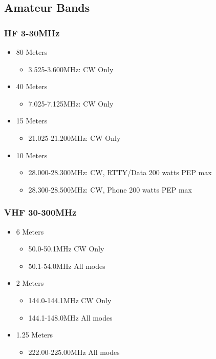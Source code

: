 \documentclass[10pt, handout]{beamer}
\begin{document}
\subsection{Amateur Bands}

\begin{frame}
\frametitle{HF 3-30MHz}
	\begin{itemize}
	\item 80 Meters
		\begin{itemize}
		\item 3.525-3.600MHz: CW Only
		\end{itemize}
	\item 40 Meters
		\begin{itemize}
		\item 7.025-7.125MHz: CW Only
		\end{itemize}
	\item 15 Meters
		\begin{itemize}
		\item 21.025-21.200MHz: CW Only
		\end{itemize}
	\item 10 Meters 
		\begin{itemize}
		\item  28.000-28.300MHz: CW, RTTY/Data 200 watts PEP max 
		\item 28.300-28.500MHz: CW, Phone 200 watts PEP max
		\end{itemize}
	\end{itemize}
\end{frame}

\begin{frame}
\frametitle{VHF 30-300MHz}
	\begin{itemize}
	\item 6 Meters
		\begin{itemize}
		\item 50.0-50.1MHz CW Only
		\item 50.1-54.0MHz All modes
		\end{itemize}
	\item 2 Meters
		\begin{itemize}
		\item  144.0-144.1MHz CW Only
		\item 144.1-148.0MHz All modes
		\end{itemize}
	\item 1.25 Meters
		\begin{itemize}
		\item 222.00-225.00MHz All modes
		\end{itemize}
	\end{itemize}
\end{frame}
\end{document}
